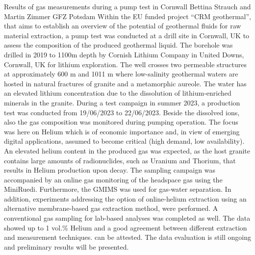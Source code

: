 \begin{conf-abstract}
{Results of gas measurements during a pump test in Cornwall}
{Bettina Strauch and Martin Zimmer}
{GFZ Potsdam}
{Within the EU funded project “CRM geothermal”, that aims to establish an overview of the potential of geothermal fluids for raw material extraction, a pump test was conducted at a drill site in Cornwall, UK to assess the composition of the produced geothermal liquid. 
The borehole was drilled in 2019 to 1100m depth by Cornish Lithium Company in United Downs, Cornwall, UK for lithium exploration. The well crosses two permeable structures at approximately 600 m and 1011 m where low-salinity geothermal waters are hosted in natural fractures of granite and a metamorphic aureole. The water has an elevated lithium concentration due to the dissolution of lithium-enriched minerals in the granite. 
During a test campaign in summer 2023, a production test was conducted from 19/06/2023 to 22/06/2023. Beside the dissolved ions, also the gas composition was monitored during pumping operation. The focus was here on Helium which is of economic importance and, in view of emerging digital applications, assumed to become critical (high demand, low availability). 
An elevated helium content in the produced gas was expected, as the host granite contains large amounts of radionuclides, such as Uranium and Thorium, that results in Helium production upon decay. 
The sampling campaign was accompanied by an online gas monitoring of the headspace gas using the MiniRuedi. Furthermore, the GMIMS was used for gas-water separation.
In addition, experiments addressing the option of online-helium extraction using an alternative membrane-based gas extraction method, were performed. 
A conventional gas sampling for lab-based analyses was completed as well. 
The data showed up to 1 vol.\% Helium and a good agreement between different extraction and measurement techniques. can be attested. The data evaluation is still ongoing and preliminary results will be presented.}
\end{conf-abstract}
